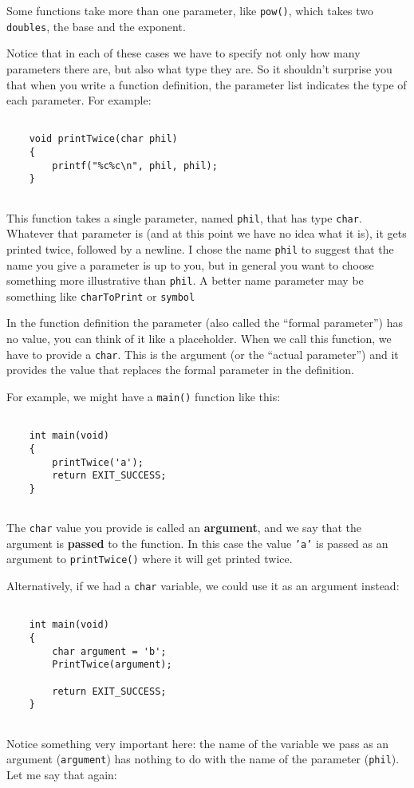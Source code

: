Some functions take more than one parameter, like {\tt pow()},
which takes two {\tt doubles}, the base and the exponent.

Notice that in each of these cases we have to specify not
only how many parameters there are, but also what type they
are.  So it shouldn't surprise you that when you write a
function definition, the parameter list indicates the type of
each parameter.  For example:

\begin{verbatim}

    void printTwice(char phil) 
    {
        printf("%c%c\n", phil, phil);
    }
  
\end{verbatim}
%
This function takes a single parameter, named {\tt phil}, that
has type {\tt char}.  Whatever that parameter is (and at
this point we have no idea what it is), it gets printed
twice, followed by a newline.
I chose the name {\tt phil} to suggest that the name
you give a parameter is up to you, but in general you want to
choose something more illustrative than {\tt phil}. A better name 
parameter may be something like {\tt charToPrint} or {\tt symbol}

In the function definition the parameter (also called the  ``formal parameter'') has no value, you can think of it like a placeholder.
When we call this function, we have to provide a {\tt char}. This is the argument (or the ``actual parameter'')
and it provides the value that replaces the formal parameter in the definition.

For example, we might have a {\tt main()} function like this:

\begin{verbatim}

    int main(void) 
    {
        printTwice('a');
        return EXIT_SUCCESS;
    }
  
\end{verbatim}
%
The {\tt char} value you provide is called an {\bf argument}, and we
say that the argument is {\bf passed} to the function.  In this
case the value {\tt 'a'} is passed as an argument
to {\tt printTwice()} where it will get printed twice.

Alternatively, if we had a {\tt char} variable, we could
use it as an argument instead:

\begin{verbatim}

    int main(void) 
    {
        char argument = 'b';
        PrintTwice(argument);
        
        return EXIT_SUCCESS;
    }
  
\end{verbatim}
%
Notice something very important here: the name of the variable we pass
as an argument ({\tt argument}) has nothing to do with the name of the
parameter ({\tt phil}).  Let me say that again:

